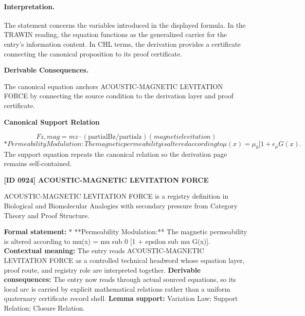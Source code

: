 \paragraph{Interpretation.}
The statement concerns the variables introduced in the displayed formula. In the TRAWIN reading, the equation functions as the generalized carrier for the entry’s information content. In CHL terms, the derivation provides a certificate connecting the canonical proposition to its proof certificate.

\par\vspace{0.35em}
\noindent\textbf{Derivable Consequences.}\quad
\begingroup
\footnotesize
\raggedright
The canonical equation anchors ACOUSTIC-MAGNETIC LEVITATION FORCE by connecting the source condition to the derivation layer and proof certificate.
\par\endgroup

\noindent\textbf{Canonical Support Relation}\par
\[
Fz,mag = mz\cdot(\mathrm{partialBz}/\mathrm{partialz}) (magnetic levitation)
\]
\[
* Permeability Modulation: The magnetic permeability is altered according to \mu(x) = \mu_0 [1 + \epsilon_\mu G(x) .
\]
\noindent The support equation repeats the canonical relation so the derivation page remains self-contained.\par

\clearpage
\noindent\textbf{[ID 0924] ACOUSTIC-MAGNETIC LEVITATION FORCE}\par
\vspace{0.35em}
\begingroup\small
{}
ACOUSTIC-MAGNETIC LEVITATION FORCE is a registry definition in Biological and Biomolecular Analogies with secondary pressure from Category Theory and Proof Structure.

\begingroup\footnotesize\setlength{\emergencystretch}{3em}\sloppy
\textbf{Formal statement:} * **Permeability Modulation:** The magnetic permeability is altered according to mu(x) = mu sub 0 [1 + epsilon sub mu G(x)]. \textbf{Contextual meaning:} The entry reads ACOUSTIC-MAGNETIC LEVITATION FORCE as a controlled technical headword whose equation layer, proof route, and registry role are interpreted together. \textbf{Derivable consequences:} The entry now reads through actual sourced equations, so its local arc is carried by explicit mathematical relations rather than a uniform quaternary certificate record shell. \textbf{Lemma support:} Variation Law; Support Relation; Closure Relation.\par
\endgroup

